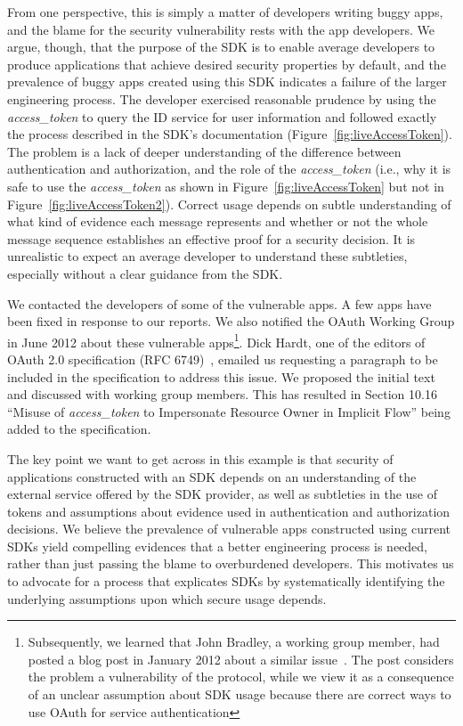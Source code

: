From one perspective, this is simply a matter of developers writing buggy apps, and the blame for the security vulnerability rests with the app developers.  We argue, though, that the purpose of the SDK is to enable average developers to produce applications that achieve desired security properties by default, and the prevalence of buggy apps created using this SDK indicates a failure of the larger engineering process.  The developer exercised reasonable prudence by using the \emph{access\_token} to query the ID service for user information and followed exactly the process described in the SDK's documentation (Figure~\ref{fig:liveAccessToken}).  The problem is a lack of deeper understanding of the difference between authentication and authorization, and the role of the \emph{access\_token} (i.e., why it is safe to use the \emph{access\_token} as shown in Figure~\ref{fig:liveAccessToken} but not in Figure~\ref{fig:liveAccessToken2}).  Correct usage depends on subtle understanding of what kind of evidence each message represents and whether or not the whole message sequence establishes an effective proof for a security decision.  It is unrealistic to expect an average developer to understand these subtleties, especially without a clear guidance from the SDK.

We contacted the developers of some of the vulnerable apps. A few apps have been fixed in response to our reports.  We also notified the OAuth Working Group in June 2012 about these vulnerable apps\footnote{Subsequently, we learned that John Bradley, a working group member, had posted a blog post in January 2012 about a similar issue~\cite{OAuthVulBlogPost}. The post considers the problem a vulnerability of the protocol, while we view it as a consequence of an unclear assumption about SDK usage because there are correct ways to use OAuth for service authentication}.  Dick Hardt, one of the editors of OAuth 2.0 specification (RFC 6749)~\cite{OAuth2.0}, emailed us requesting a paragraph to be included in the specification to address this issue.  We proposed the initial text and discussed with working group members.  This has resulted in Section 10.16 ``Misuse of \emph{access\_token} to Impersonate Resource Owner in Implicit Flow'' being added to the specification.

The key point we want to get across in this example is that security of applications constructed with an SDK depends on an understanding of the external service offered by the SDK provider, as well as subtleties in the use of tokens and assumptions about evidence used in authentication and authorization decisions.  We believe the prevalence of vulnerable apps constructed using current SDKs yield compelling evidences that a better engineering process is needed, rather than just passing the blame to overburdened developers.  This motivates us to advocate for a process that explicates SDKs by systematically identifying the underlying assumptions upon which secure usage depends.


